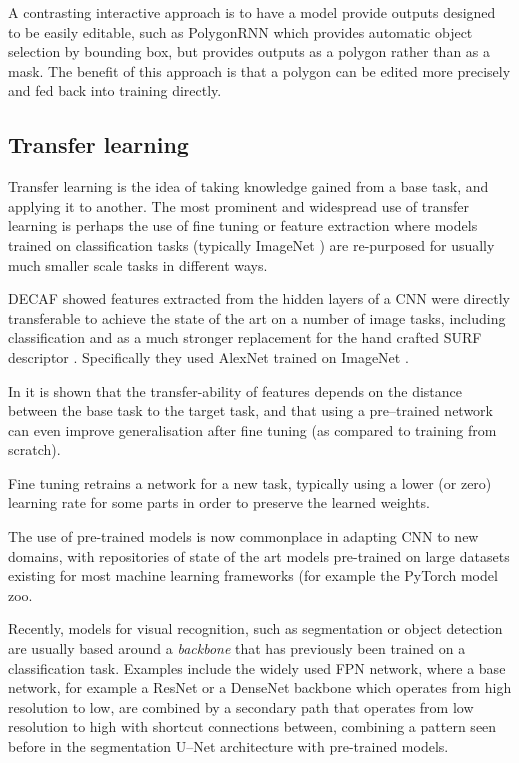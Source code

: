 A contrasting interactive approach is to have a model provide outputs designed to be easily editable, such as PolygonRNN \cite{Castrejon2017} which provides automatic object selection by bounding box, but provides outputs as a polygon rather than as a mask. The benefit of this approach is that a polygon can be edited more precisely and fed back into training directly.


\subsection {Transfer learning}

Transfer learning is the idea of taking knowledge gained from a base task, and applying it to another. The most prominent and widespread use of transfer learning is perhaps the use of fine tuning or feature extraction where models trained on classification tasks (typically ImageNet \cite{JiaDeng2009}) are re-purposed for usually much smaller scale tasks in different ways. 

\gls{DECAF} \cite{Donahue2014} showed features extracted from the hidden layers of a \gls{CNN} were directly transferable to achieve the state of the art on a number of image tasks, including classification and as a much stronger replacement for the hand crafted \gls{SURF} descriptor \cite{bay2006surf}.  Specifically they used AlexNet  \cite{Krizhevsky2012} trained on ImageNet \cite{JiaDeng2009}.

In \cite{Yosinski} it is shown that the transfer-ability of features depends on the distance between the base task to the target task, and that using a pre--trained network can even improve generalisation after fine tuning (as compared to training from scratch).

Fine tuning retrains a network for a new task, typically using a lower (or zero) learning rate for some parts in order to preserve the learned weights. 

The use of pre-trained models is now commonplace in adapting \gls{CNN} to new domains, with repositories of state of the art models pre-trained on large datasets existing for most machine learning frameworks (for example the PyTorch \cite{Paszke2017} model zoo. 

Recently, models for visual recognition, such as segmentation or object detection are usually based around a \emph{backbone} that has previously been trained on a classification task. Examples include the widely used \gls{FPN} network, \cite{Lin2017a} where a base network, for example a ResNet \cite{He} or a DenseNet \cite{Huang2016} backbone which operates from high resolution to low, are combined by a secondary path that operates from low resolution to high with shortcut connections between, combining a pattern seen before in the segmentation U--Net \cite{Ronneberger2015} architecture with pre-trained models.

